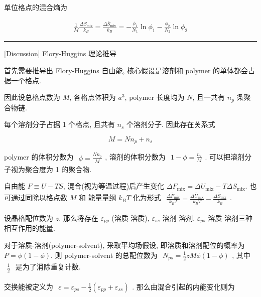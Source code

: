\documentclass[../../main.tex]{subfiles}
\begin{document}
\begin{enumerate}
{{单位格点的混合熵为

$$
\begin{aligned}
\frac{1}{M}\frac{\Delta S_{\text{mix}}}{k_{B}} = \boxed{\frac{\Delta\bar{S}_{\text{mix}}}{k_{B}} = -\frac{\phi_{1}}{N_{1}}\ln{\phi_{1}} - \frac{\phi_{2}}{N_{2}}\ln{\phi_{2}}}
\end{aligned}
$$

\begin{center}
\rule{0.8\textwidth}{0.4pt}
\end{center}

[Discussion] Flory-Huggins 理论推导

首先需要推导出 Flory-Huggins 自由能, 核心假设是溶剂和 polymer 的单体都会占据一个格点. 

因此设总格点数为 $M$, 各格点体积为 $a^{3}$, polymer 长度均为 $N$, 且一共有 $n_{p}$ 条聚合物链. 

每个溶剂分子占据 1 个格点, 且共有 $n_{s}$ 个溶剂分子. 因此存在关系式

$$
M =  Nn_{p} + n_{s} 
$$

polymer 的体积分数为 $\begin{aligned}\phi = \frac{Nn_{p}}{M}\end{aligned}$, 溶剂的体积分数为 $\begin{aligned}1 - \phi = \frac{n_{s}}{M}\end{aligned}$. 可以把溶剂分子视为聚合度为 1 的聚合物. 

自由能 $F \equiv U - TS$, 混合(视为等温过程)后产生变化 $\Delta F_{\text{mix}} = \Delta U_{\text{mix}} - T\Delta S_{\text{mix}}$. 也可通过同除以格点数 $M$ 和 能量量纲 $k_{B}T$ 化为形式 $\begin{aligned}\frac{\Delta\bar{F}_{\text{mix}}}{k_{B}T} = \frac{\Delta\bar{U}_{\text{mix}}}{k_{B}T} - \frac{\Delta\bar{S}_{\text{mix}}}{k_{B}}\end{aligned}$. 

设晶格配位数为 $z$. 那么将存在 $\varepsilon_{pp}$ (溶质-溶质), $\varepsilon_{ss}$ 溶剂-溶剂, $\varepsilon_{ps}$ 溶质-溶剂三种相互作用的能量. 

对于溶质-溶剂(polymer-solvent), 采取平均场假设, 即溶质和溶剂配位的概率为 $P = \phi(1-\phi)$. 则 polymer-solvent 的总配位数为 $\begin{aligned}N_{ps} = \frac{1}{2}zM\phi(1-\phi)\end{aligned}$, 其中 $\begin{aligned}\frac{1}{2}\end{aligned}$ 是为了消除重复计数. 

交换能被定义为 $\begin{aligned}\varepsilon = \varepsilon_{ps} - \frac{1}{2}(\varepsilon_{pp} + \varepsilon_{ss})\end{aligned}$. 那么由混合引起的内能变化则为

}}
\end{enumerate}
\end{document}
